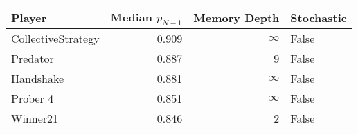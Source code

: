 \begin{tabular}{lrrl}
\toprule
             Player &  Median $p_{N-1}$ &  Memory Depth & Stochastic \\
\midrule
 CollectiveStrategy &             0.909 &            \(\infty\) &      False \\
           Predator &             0.887 &             9 &      False \\
          Handshake &             0.881 &            \(\infty\) &      False \\
           Prober 4 &             0.851 &            \(\infty\) &      False \\
           Winner21 &             0.846 &             2 &      False \\
\bottomrule
\end{tabular}
